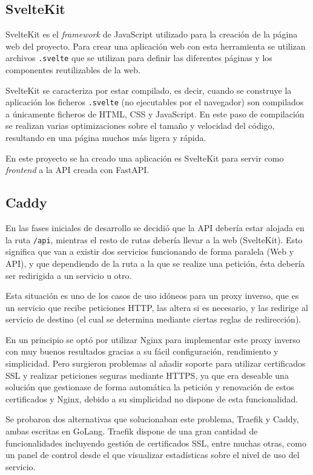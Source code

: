 \subsection{SvelteKit}

SvelteKit es el \textit{framework} de JavaScript utilizado para la creación de
la página web del proyecto. Para crear una aplicación web con esta herramienta
se utilizan archivos \texttt{.svelte} que se utilizan para definir las
diferentes páginas y los componentes reutilizables de la web.

SvelteKit se caracteriza por estar compilado, es decir, cuando se construye la
aplicación los ficheros \texttt{.svelte} (no ejecutables por el navegador) son
compilados a únicamente ficheros de HTML, CSS y JavaScript. En este paso de
compilación se realizan varias optimizaciones sobre el tamaño y velocidad del
código, resultando en una página muchos más ligera y rápida.

En este proyecto se ha creado una aplicación es SvelteKit para servir como
\textit{frontend} a la API creada con FastAPI.


\subsection{Caddy}

En las fases iniciales de desarrollo se decidió que la API debería estar alojada
en la ruta \texttt{/api}, mientras el resto de rutas debería llevar a la web
(SvelteKit). Esto significa que van a existir dos servicios funcionando de forma
paralela (Web y API), y que dependiendo de la ruta a la que se realize una
petición, ésta debería ser redirigida a un servicio u otro.

Esta situación es uno de los casos de uso idóneos para un proxy inverso, que es
un servicio que recibe peticiones HTTP, las altera si es necesario, y las
redirige al servicio de destino (el cual se determina mediante ciertas reglas de
redirección).

En un principio se optó por utilizar Nginx para implementar este proxy inverso
con muy buenos resultados gracias a su fácil configuración, rendimiento y
simplicidad. Pero surgieron problemas al añadir soporte para utilizar
certificados SSL y realizar peticiones seguras mediante HTTPS, ya que era
deseable una solución que gestionase de forma automática la petición y
renovación de estos certificados y Nginx, debido a su simplicidad no dispone de
esta funcionalidad.

Se probaron dos alternativas que solucionaban este problema, Traefik y Caddy,
ambas escritas en GoLang. Traefik dispone de una gran cantidad de
funcionalidades incluyendo gestión de certificados SSL, entre muchas otras, como
un panel de control desde el que visualizar estadísticas sobre el nivel de uso
del servicio.

